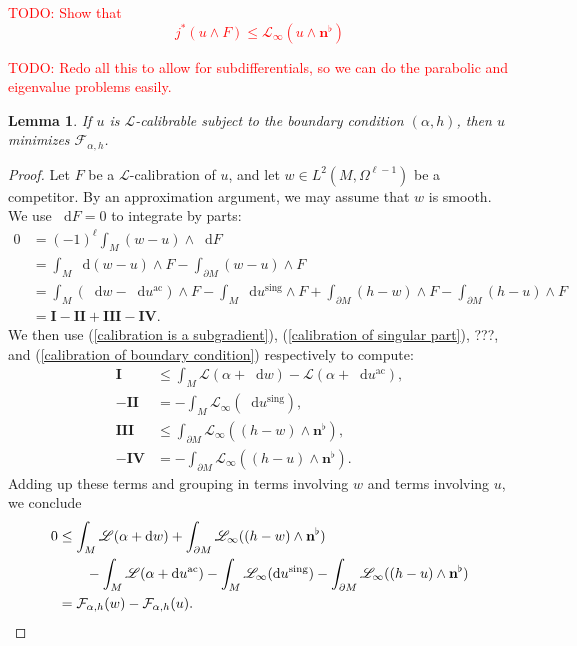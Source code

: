 \documentclass[reqno,11pt]{amsart}
\newcommand*\dif{\mathop{}\!\mathrm{d}}
\newcommand{\Lagrange}{\mathscr L}
\newcommand{\normal}{\mathbf n}
\newcommand{\ac}{\mathrm{ac}}
\newcommand{\sing}{\mathrm{sing}}
\newtheorem{lemma}[theorem]{Lemma}
\theoremstyle{definition}
\numberwithin{equation}{section}
\newcommand\todo[1]{\textcolor{red}{TODO: #1}}
\begin{document}
\todo{Show that 
$$j^*(u \wedge F) \leq \Lagrange_\infty(u \wedge \normal^\flat)$$
}

\todo{Redo all this to allow for subdifferentials, so we can do the parabolic and eigenvalue problems easily.}

\begin{lemma}
If $u$ is $\Lagrange$-calibrable subject to the boundary condition $(\alpha, h)$, then $u$ minimizes $\mathcal F_{\alpha, h}$.
\end{lemma}
\begin{proof}
Let $F$ be a $\Lagrange$-calibration of $u$, and let $w \in L^2(M, \Omega^{\ell - 1})$ be a competitor.
By an approximation argument, we may assume that $w$ is smooth.
We use $\dif F = 0$ to integrate by parts:
\begin{align*}
0 
&= (-1)^\ell \int_M (w - u) \wedge \dif F \\
&= \int_M \dif(w - u) \wedge F - \int_{\partial M} (w - u) \wedge F \\
&= \int_M (\dif w - \dif u^\ac) \wedge F - \int_M \dif u^\sing \wedge F + \int_{\partial M} (h - w) \wedge F - \int_{\partial M} (h - u) \wedge F \\
&= \mathbf I - \mathbf{II} + \mathbf{III} - \mathbf{IV}.
\end{align*}
We then use (\ref{calibration is a subgradient}), (\ref{calibration of singular part}), ???, and (\ref{calibration of boundary condition}) respectively to compute:
\begin{align*}
\mathbf I &\leq \int_M \Lagrange(\alpha + \dif w) - \Lagrange(\alpha + \dif u^\ac), \\
-\mathbf{II} &= -\int_M \Lagrange_\infty(\dif u^\sing), \\ 
\mathbf{III} &\leq \int_{\partial M} \Lagrange_\infty((h - w) \wedge \normal^\flat), \\
-\mathbf{IV} &= -\int_{\partial M} \Lagrange_\infty((h - u) \wedge \normal^\flat).
\end{align*}
Adding up these terms and grouping in terms involving $w$ and terms involving $u$, we conclude 
\begin{align*}
0 
&\leq \int_M \Lagrange(\alpha + \dif w) + \int_{\partial M} \Lagrange_\infty((h - w) \wedge \normal^\flat) \\
&\qquad - \int_M \Lagrange(\alpha + \dif u^\ac) - \int_M \Lagrange_\infty(\dif u^\sing) - \int_{\partial M} \Lagrange_\infty((h - u) \wedge \normal^\flat) \\
&= \mathcal F_{\alpha, h}(w) - \mathcal F_{\alpha, h}(u). \qedhere
\end{align*}
\end{proof}
\end{document}
